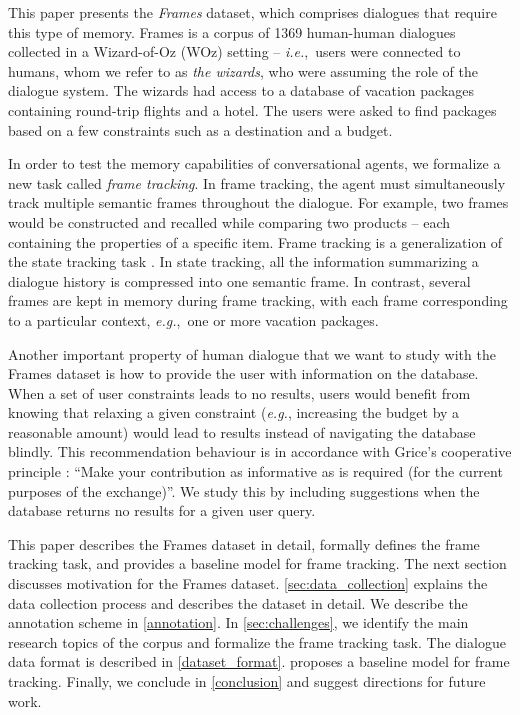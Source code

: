 \documentclass{article}
\theoremstyle{definition}
\newcommand{\ndialogues}{1369}
\begin{document}
This paper presents the \emph{Frames} dataset, which comprises dialogues that require this type of memory. Frames is a corpus of \ndialogues{} human-human dialogues collected in a Wizard-of-Oz (WOz) setting -- \textit{i.e.},~users were connected to humans, whom we refer to as \textit{the wizards}, who were assuming the role of the dialogue system. The wizards had access to a database of vacation packages containing round-trip flights and a hotel. The users were asked to find packages based on a few constraints such as a destination and a budget. 

In order to test the memory capabilities of conversational agents, we formalize a new task called \emph{frame tracking}. In frame tracking, the agent must simultaneously track multiple semantic frames throughout the dialogue. For example, two frames would be constructed and recalled while comparing two products -- each containing the properties of a specific item. Frame tracking is a generalization of the state tracking task \citep{Henderson:15}. In state tracking, all the information summarizing a dialogue history is compressed into one semantic frame. In contrast, several frames are kept in memory during frame tracking, with each frame corresponding to a particular context, \textit{e.g.},~one or more vacation packages.

Another important property of human dialogue that we want to study with the Frames dataset is how to provide the user with information on the database. When a set of user constraints leads to no results, users would benefit from knowing that relaxing a given constraint (\textit{e.g.}, increasing the budget by a reasonable amount) would lead to results instead of navigating the database blindly. This recommendation behaviour is in accordance with Grice's cooperative principle \citep{Grice:89}: ``Make your contribution as informative as is required (for the current purposes of the exchange)''. We study this by including suggestions when the database returns no results for a given user query.

This paper describes the Frames dataset in detail, formally defines the frame tracking task, and provides a baseline model for frame tracking. The next section discusses motivation for the Frames dataset. \cref{sec:data_collection} explains the data collection process and  describes the dataset in detail. We describe the annotation scheme in \cref{annotation}. In \cref{sec:challenges}, we identify the main research topics of the corpus and formalize the frame tracking task. The dialogue data format is described in \cref{dataset_format}.  proposes a baseline model for frame tracking. Finally, we conclude in \cref{conclusion} and suggest directions for future work.
\end{document}
